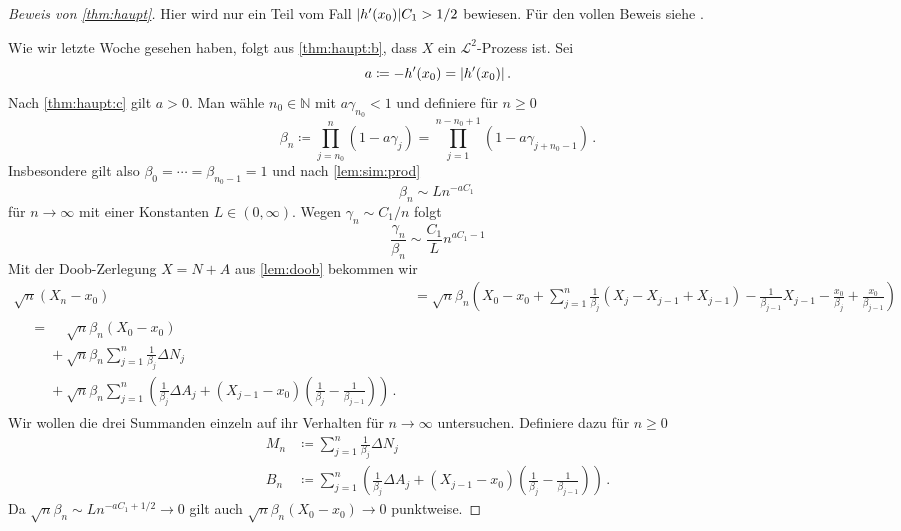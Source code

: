 \documentclass[ngerman,a4paper,11pt]{scrartcl}
\newcommand{\NN}{\mathbb{N}}
\renewcommand{\ll}{\mathcal{L}}
\DeclarePairedDelimiter{\abs}{\lvert}{\rvert}		%
\begin{document}
\begin{proof}[Beweis von \cref{thm:haupt}]
  Hier wird nur ein Teil vom Fall $\abs{h'(x_0)}C_1>1/2$ bewiesen. Für
  den vollen Beweis siehe \cite[Satz~11.4]{lusch}.
  
Wie wir letzte Woche gesehen haben, folgt aus \cref{thm:haupt:b}, dass $X$ ein
$\ll^2$-Prozess ist. Sei
\begin{equation*}
 a\coloneqq -h'(x_0)=\abs{h'(x_0)}\,. 
\end{equation*}
Nach \ref{thm:haupt:c} gilt $a>0$. Man wähle $n_0\in\NN$ mit $a\gamma_{n_0}<1$ und
definiere für $n\geq 0$
\begin{equation*}
 \beta_n\coloneqq\prod_{j=n_0}^n(1-a\gamma_j) =\prod_{j=1}^{n-n_0+1}(1-a\gamma_{j+n_0-1})\,.
\end{equation*}
Insbesondere gilt also $\beta_0=\dotsb=\beta_{n_0-1}=1$ und nach \cref{lem:sim:prod}
\begin{equation}\label{eq:beta}
 \beta_n\sim Ln^{-aC_1}\,
\end{equation}
für $n\to\infty$ mit einer Konstanten $L\in(0,\infty)$. Wegen $\gamma_n\sim
C_1/n$ folgt
\begin{equation}
  \frac{\gamma_n}{\beta_n}\sim\frac{C_1}{L}n^{aC_1-1}\label{eq:gammabeta}
\end{equation}
Mit der Doob-Zerlegung $X=N+A$ aus \cref{lem:doob} bekommen wir
\begin{align}
  \sqrt{n}(X_n-x_0)&=\sqrt{n}\beta_n\left(X_0-x_0+\sum_{j=1}^n\frac{1}{\beta_j}(X_j - X_{j-1} + X_{j-1})-\frac{1}{\beta_{j-1}}X_{j-1}-\frac{x_0}{\beta_j}+\frac{x_0}{\beta_{j-1}}\right)\nonumber \\
  \begin{split}\label{eq:zerl}
&=\phantom{+}\sqrt{n}\beta_n(X_0-x_0)\\
&\phantom{=}+\sqrt{n}\beta_n\sum_{j=1}^n\frac{1}{\beta_j}\Delta N_j\\
&\phantom{=}+\sqrt{n}\beta_n\sum_{j=1}^n\left(\frac{1}{\beta_j}\Delta A_j+(X_{j-1}-x_0)(\frac{1}{\beta_j}-\frac{1}{\beta_{j-1}})\right)\,. 
\end{split}
\end{align}
Wir wollen die drei Summanden einzeln auf ihr Verhalten für $n\to\infty$
untersuchen. Definiere dazu für $n\geq 0$
\begin{align*}
 M_n&\coloneqq \sum_{j=1}^n\frac{1}{\beta_j}\Delta N_j\\
B_n&\coloneqq\sum_{j=1}^n\left(\frac{1}{\beta_j}\Delta A_j+(X_{j-1}-x_0)(\frac{1}{\beta_j}-\frac{1}{\beta_{j-1}})\right)\,.
\end{align*}
Da $\sqrt{n}\beta_n\sim Ln^{-aC_1+1/2}\to 0$ gilt auch
$\sqrt{n}\beta_n(X_0-x_0)\to 0$ punktweise.


\end{proof}
\end{document}
